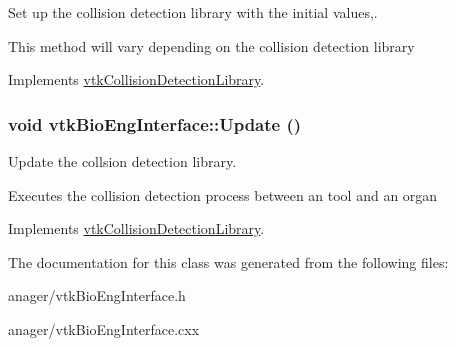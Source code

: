 Set up the collision detection library with the initial values,. 

This method will vary depending on the collision detection library 

Implements \hyperlink{classvtkCollisionDetectionLibrary_ac29256d189958f001608f8f5d170a73c}{vtkCollisionDetectionLibrary}.

\hypertarget{classvtkBioEngInterface_af04a067b7a6f524faa7ff14552147260}{
\subsubsection[{Update}]{\setlength{\rightskip}{0pt plus 5cm}void vtkBioEngInterface::Update ()}}
\label{classvtkBioEngInterface_af04a067b7a6f524faa7ff14552147260}


Update the collsion detection library. 

Executes the collision detection process between an tool and an organ 

Implements \hyperlink{classvtkCollisionDetectionLibrary_ae3ce4d5055eee783a8bf9f06f62f5667}{vtkCollisionDetectionLibrary}.



The documentation for this class was generated from the following files:\begin{DoxyCompactItemize}
\item 
anager/vtkBioEngInterface.h\item 
anager/vtkBioEngInterface.cxx\end{DoxyCompactItemize}
